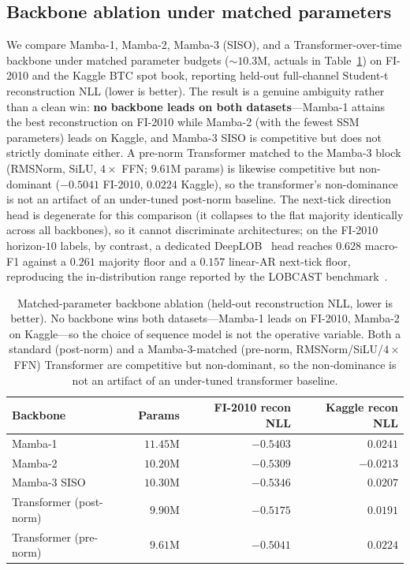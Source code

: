 \documentclass{article}
\begin{document}
\subsection{Backbone ablation under matched parameters}\label{sec:results_ablation}

We compare Mamba-1, Mamba-2, Mamba-3 (SISO), and a Transformer-over-time backbone under
matched parameter budgets ($\sim\!10.3$M, actuals in Table~\ref{tab:backbone_ablation}) on
FI-2010 and the Kaggle BTC spot book, reporting held-out full-channel Student-t
reconstruction NLL (lower is better). The result is a genuine ambiguity rather than a clean
win: \textbf{no backbone leads on both datasets}---Mamba-1 attains the best
reconstruction on FI-2010 while Mamba-2 (with the fewest SSM parameters) leads on Kaggle,
and Mamba-3 SISO is competitive but does not strictly dominate either. A pre-norm Transformer
matched to the Mamba-3 block (RMSNorm, SiLU, $4\times$ FFN; $9.61$M params) is likewise
competitive but non-dominant ($-0.5041$ FI-2010, $0.0224$ Kaggle), so the transformer's
non-dominance is not an artifact of an under-tuned post-norm baseline. The next-tick
direction head is degenerate for this comparison (it collapses to the flat majority
identically across all backbones), so it cannot discriminate architectures; on the FI-2010
horizon-$10$ labels, by contrast, a dedicated DeepLOB~\citep{zhang2019deeplob} head reaches
$0.628$ macro-F1 against a $0.261$ majority floor and a $0.157$ linear-AR next-tick floor,
reproducing the in-distribution range reported by the LOBCAST benchmark~\citep{prata2023lobcast}.

\begin{table}[t]
\centering
\small
\begin{tabular}{lrrr}
\toprule
Backbone & Params & FI-2010 recon NLL & Kaggle recon NLL \\
\midrule
Mamba-1      & $11.45$M & $\mathbf{-0.5403}$ & $0.0241$ \\
Mamba-2      & $10.20$M & $-0.5309$ & $\mathbf{-0.0213}$ \\
Mamba-3 SISO & $10.30$M & $-0.5346$ & $0.0207$ \\
Transformer (post-norm) & $9.90$M  & $-0.5175$ & $0.0191$ \\
Transformer (pre-norm)  & $9.61$M  & $-0.5041$ & $0.0224$ \\
\bottomrule
\end{tabular}
\caption{Matched-parameter backbone ablation (held-out reconstruction NLL, lower is better).
No backbone wins both datasets---Mamba-1 leads on FI-2010, Mamba-2 on Kaggle---so the choice
of sequence model is not the operative variable.  Both a standard (post-norm) and a
Mamba-3-matched (pre-norm, RMSNorm/SiLU/$4\times$ FFN) Transformer are competitive but
non-dominant, so the non-dominance is not an artifact of an under-tuned transformer baseline.}
\label{tab:backbone_ablation}
\end{table}
\end{document}
